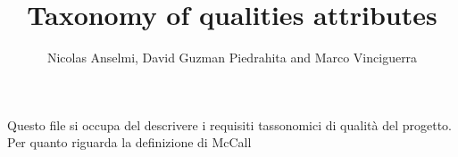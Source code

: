 \documentclass{article}
\title{Taxonomy of qualities attributes}
\author{Nicolas Anselmi, David Guzman Piedrahita and Marco Vinciguerra}
\begin{document}
\maketitle
Questo file si occupa del descrivere i requisiti tassonomici di qualità del progetto.
\\Per quanto riguarda la definizione di McCall
\end{document}
